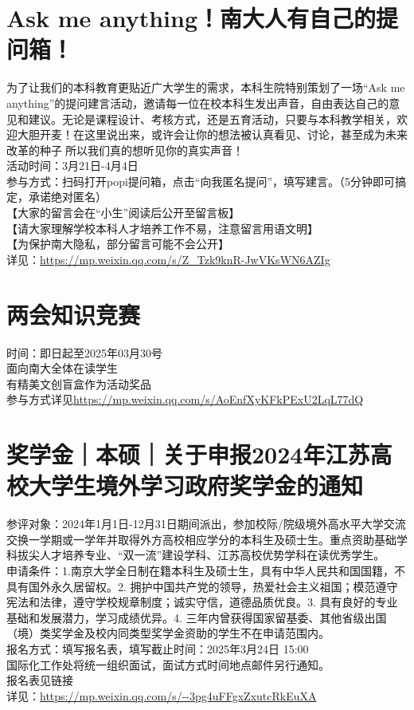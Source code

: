 \documentclass[letterpaper, 12pt]{article}
\begin{document}
\begin{multicols}{2}
\section{Ask me anything！南大人有自己的提问箱！}
为了让我们的本科教育更贴近广大学生的需求，本科生院特别策划了一场“Ask me anything”的提问建言活动，邀请每一位在校本科生发出声音，自由表达自己的意见和建议。无论是课程设计、考核方式，还是五育活动，只要与本科教学相关，欢迎大胆开麦！在这里说出来，或许会让你的想法被认真看见、讨论，甚至成为未来改革的种子🌱所以我们真的想听见你的真实声音！
\\活动时间：3月21日-4月4日
\\参与方式：扫码打开popi提问箱，点击“向我匿名提问”，填写建言。（5分钟即可搞定，承诺绝对匿名）
\\【大家的留言会在“小生”阅读后公开至留言板】
\\【请大家理解学校本科人才培养工作不易，注意留言用语文明】
\\【为保护南大隐私，部分留言可能不会公开】
\\详见：\url{https://mp.weixin.qq.com/s/Z_Tzk9knR-JwVKsWN6AZIg}

\section{两会知识竞赛}
时间：即日起至2025年03月30号\\
面向南大全体在读学生\\
有精美文创盲盒作为活动奖品\\
参与方式详见\url{https://mp.weixin.qq.com/s/AoEnfXyKFkPExU2LqL77dQ}

\section{奖学金｜本硕｜关于申报2024年江苏高校大学生境外学习政府奖学金的通知}
参评对象：2024年1月1日-12月31日期间派出，参加校际/院级境外高水平大学交流交换一学期或一学年并取得外方高校相应学分的本科生及硕士生。重点资助基础学科拔尖人才培养专业、“双一流”建设学科、江苏高校优势学科在读优秀学生。
\\申请条件：1.南京大学全日制在籍本科生及硕士生，具有中华人民共和国国籍，不具有国外永久居留权。2. 拥护中国共产党的领导，热爱社会主义祖国；模范遵守宪法和法律，遵守学校规章制度；诚实守信，道德品质优良。3. 具有良好的专业基础和发展潜力，学习成绩优异。4. 三年内曾获得国家留基委、其他省级出国（境）类奖学金及校内同类型奖学金资助的学生不在申请范围内。
\\报名方式：填写报名表，填写截止时间：2025年3月24日 15:00
\\国际化工作处将统一组织面试，面试方式时间地点邮件另行通知。
\\报名表见链接
\\详见：\url{https://mp.weixin.qq.com/s/--3pg4uFFgxZxutcRkEuXA}


\end{multicols}
\end{document}
